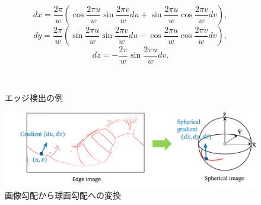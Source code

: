 \begin{equation}
dx = \frac{2\pi}{w}\left(\cos\frac{2\pi u}{w}\sin\frac{2\pi v}{w}du+\sin\frac{2\pi u}{w}\cos\frac{2\pi v}{w}dv\right),
\end{equation}
\begin{equation}
dy= \frac{2\pi}{w}\left(\sin\frac{2\pi u}{w}\sin\frac{2\pi v}{w}du-\cos\frac{2\pi u}{w}\cos\frac{2\pi v}{w}dv\right),
\end{equation}
\begin{equation}
dz= -\frac{2\pi}{w}\sin\frac{2\pi u}{w}dv.
\end{equation}

\setlength
\subfigcapskip{-0.6ex}
\begin{figure}[h]
	\begin{center}
		\\
		\vspace{-5mm}
		\vspace{-3mm}
	\caption{エッジ検出の例}
	\label{fig:edge_detection}
	\end{center}
\end{figure}

\begin{figure}[b]
 \begin{center}
 \includegraphics[width=0.85\columnwidth]{./chap3/fig/conversion.png}
 \vspace{0mm}
 \caption{画像勾配から球面勾配への変換}
 \label{fig:conversion}
 \end{center}
\end{figure}

